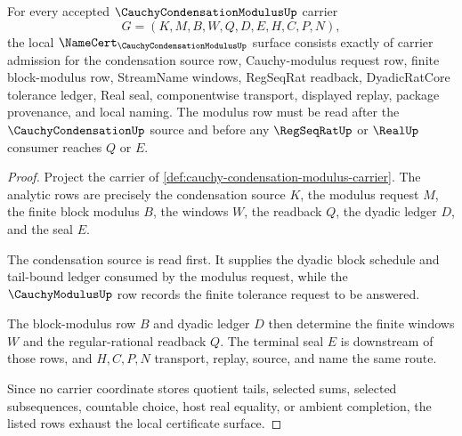 \begin{theorem}
\label{thm:cauchy-condensation-modulus-namecert-obligations}
For every accepted $\CauchyCondensationModulusUp$ carrier
$$
G=(K,M,B,W,Q,D,E,H,C,P,N),
$$
the local $\NameCert_{\CauchyCondensationModulusUp}$ surface consists exactly of carrier admission for the condensation source row, Cauchy-modulus request row, finite block-modulus row, StreamName windows, RegSeqRat readback, DyadicRatCore tolerance ledger, Real seal, componentwise transport, displayed replay, package provenance, and local naming. The modulus row must be read after the $\CauchyCondensationUp$ source and before any $\RegSeqRatUp$ or $\RealUp$ consumer reaches $Q$ or $E$.
\end{theorem}
\begin{proof}
Project the carrier of \autoref{def:cauchy-condensation-modulus-carrier}. The analytic rows are precisely the condensation source $K$, the modulus request $M$, the finite block modulus $B$, the windows $W$, the readback $Q$, the dyadic ledger $D$, and the seal $E$.

The condensation source is read first. It supplies the dyadic block schedule and tail-bound ledger consumed by the modulus request, while the $\CauchyModulusUp$ row records the finite tolerance request to be answered.

The block-modulus row $B$ and dyadic ledger $D$ then determine the finite windows $W$ and the regular-rational readback $Q$. The terminal seal $E$ is downstream of those rows, and $H,C,P,N$ transport, replay, source, and name the same route.

Since no carrier coordinate stores quotient tails, selected sums, selected subsequences, countable choice, host real equality, or ambient completion, the listed rows exhaust the local certificate surface.
\end{proof}

